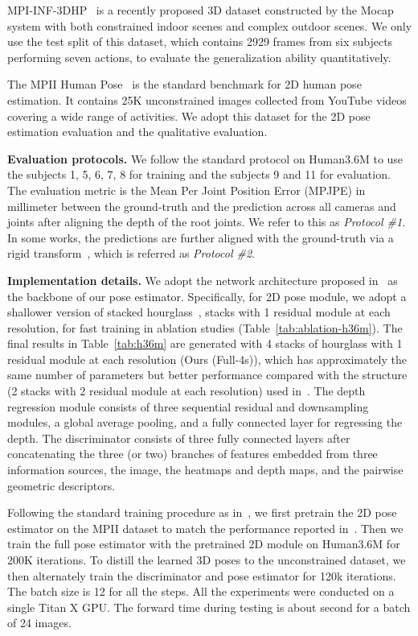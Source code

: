 \documentclass[10pt,twocolumn,letterpaper]{article}
\newcommand{\smalltitle}[1]{\vspace{0.2em}\noindent \textbf{{#1}}}
\begin{document}
MPI-INF-3DHP~\cite{mehta2017monocular} is a recently proposed 3D dataset constructed by the Mocap system with both constrained indoor scenes and complex outdoor scenes. We only use the test split of this dataset, which contains 2929 frames from six subjects performing seven actions, to evaluate the generalization ability quantitatively. 

The MPII Human Pose~\cite{andriluka20142d} is the standard benchmark for 2D human pose estimation. 
It contains 25K unconstrained images collected from YouTube videos covering a wide range of activities. 
We adopt this dataset for the 2D pose estimation evaluation and the qualitative evaluation. 


\smalltitle{Evaluation protocols.}  
We follow the standard protocol on Human3.6M to use the subjects 1, 5, 6, 7, 8 for training and the subjects 9 and 11 for evaluation. 
The evaluation metric is the Mean Per Joint Position Error (MPJPE) in millimeter between the ground-truth and the prediction across all cameras and joints after aligning the depth of the root joints.
We refer to this as \textit{Protocol \#1}.
In some works, the predictions are further aligned with the ground-truth via a rigid transform~\cite{bogo2016keep, moreno20163d, martinez2017simple}, which is referred as \textit{Protocol \#2}. 


\smalltitle{Implementation details.}  
We adopt the network architecture proposed in~\cite{zhou2017towards} as the backbone of our pose estimator. 
Specifically, for 2D pose module, we adopt a shallower version of stacked hourglass~\cite{newell2016stacked},  stacks with 1 residual module at each resolution, for fast training in ablation studies (Table~\ref{tab:ablation-h36m}). 
The final results in Table~\ref{tab:h36m} are generated with 4 stacks of hourglass with 1 residual module at each resolution (\ie Ours (Full-4s)), which has approximately the same number of parameters but better performance compared with the structure (2 stacks with 2 residual module at each resolution) used in~\cite{zhou2017towards}. 
The depth regression module consists of three sequential residual and downsampling modules, a global average pooling, and a fully connected layer for regressing the depth. 
The discriminator consists of three fully connected layers after concatenating the three (or two) branches of features embedded from three information sources, \ie the image, the heatmaps and depth maps, and the pairwise geometric descriptors.  

Following the standard training procedure as in~\cite{zhou2017towards, martinez2017simple}, we first pretrain the 2D pose estimator on the MPII dataset to match the performance reported in~\cite{newell2016stacked}. Then we train the full pose estimator with the pretrained 2D module on Human3.6M for 200K iterations. 
To distill the learned 3D poses to the unconstrained dataset, we then alternately train the discriminator and pose estimator for 120k iterations. The batch size is 12 for all the steps. 
All the experiments were conducted on a single Titan X GPU. 
The forward time during testing is about  second for a batch of 24 images.  
\end{document}
